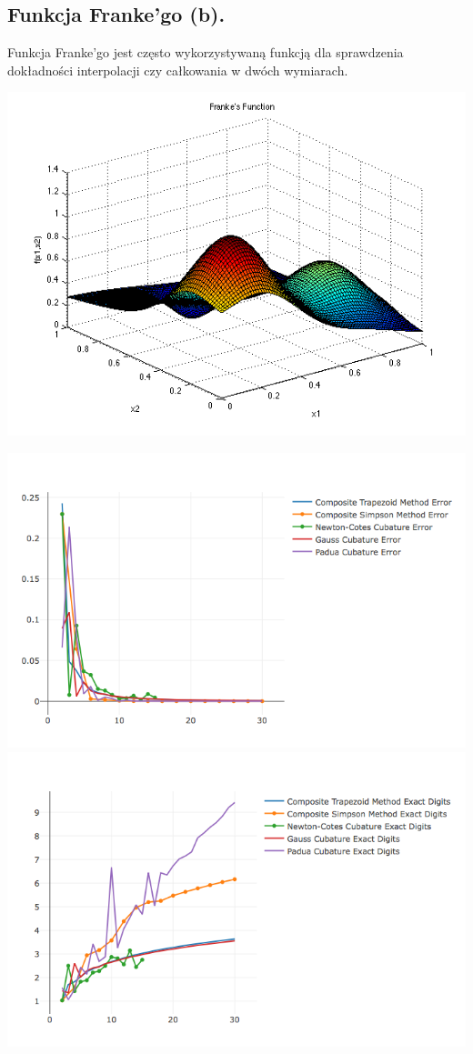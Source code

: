 \documentclass[10pt,wide]{mwart}
\theoremstyle{definition}
\begin{document}
\subsection{Funkcja Franke'go (b).}
Funkcja Franke'go jest często wykorzystywaną funkcją dla sprawdzenia dokładności interpolacji czy całkowania w dwóch wymiarach. \\
\begin{center}
\includegraphics[scale=0.5]{franke2d.png}
\end{center}
\includegraphics[scale=0.7]{franke.png}
\includegraphics[scale=0.7]{franked.png}
\end{document}
